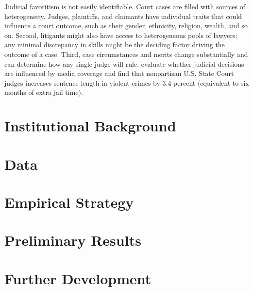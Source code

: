 \documentclass[11pt]{article}
\begin{document}
Judicial favoritism is not easily identifiable. Court cases are filled with sources of heterogeneity. Judges, plaintiffs, and claimants have individual traits that could influence a court outcome, such as their gender, ethnicity, religion, wealth, and so on. Second, litigants might also have access to heterogeneous pools of lawyers; any minimal discrepancy in skills might be the deciding factor driving the outcome of a case. Third, case circumstances and merits change substantially and can determine how any single judge will rule. \citet{LimJudgePoliticianPress2015} evaluate whether judicial decisions are influenced by media coverage and find that nonpartisan U.S. State Court judges increases sentence length in violent crimes by 3.4 percent (equivalent to six months of extra jail time).

\section{Institutional Background} \label{sec:background_paper2}

\section{Data} \label{sec:data_paper2}



\section{Empirical Strategy} \label{sec:methods_paper2}

\section{Preliminary Results} \label{sec:results_paper2}

\section{Further Development} \label{sec:conclusion_paper2}

\clearpage

\setlength\bibsep{0pt}


\end{document}
